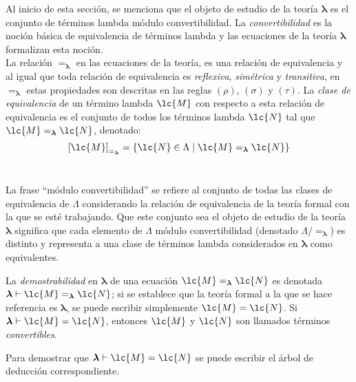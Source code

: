 Al inicio de esta sección, se menciona que el objeto de estudio de la teoría \(\boldsymbol{\lambda}\) es el conjunto de términos lambda módulo convertibilidad. La \emph{convertibilidad} es la noción básica de equivalencia de términos lambda y las ecuaciones de la teoría \(\boldsymbol{\lambda}\) formalizan esta noción. \\

La relación \(=_{\boldsymbol{\lambda}}\) en las ecuaciones de la teoría, es una relación de equivalencia y al igual que toda relación de equivalencia es \emph{reflexiva}, \emph{simétrica} y \emph{transitiva}, en \(=_{\boldsymbol{\lambda}}\) estas propiedades son descritas en las reglas \((\rho)\), \((\sigma)\) y \((\tau)\). La \emph{clase de equivalencia} de un término lambda \(\lc{M}\) con respecto a esta relación de equivalencia es el conjunto de todos los términos lambda \(\lc{N}\) tal que \(\lc{M}=_{\boldsymbol{\lambda}}\lc{N}\), denotado: \\

\[\left[ \lc{M} \right]_{=_{\boldsymbol{\lambda}}} = \left\{ \lc{N} \in \Lambda \mid \lc{M}=_{\boldsymbol{\lambda}}\lc{N} \right\}\] \

La frase ``módulo convertibilidad'' se refiere al conjunto de todas las clases de equivalencia de \(\Lambda\) considerando la relación de equivalencia de la teoría formal con la que se esté trabajando. Que este conjunto sea el objeto de estudio de la teoría \(\boldsymbol{\lambda}\) significa que cada elemento de \(\Lambda\) módulo convertibilidad (denotado \(\Lambda / =_{\boldsymbol{\lambda}}\)) es distinto y representa a una clase de términos lambda considerados en \(\boldsymbol{\lambda}\) como equivalentes. \\

\begin{defi}[Demostrabilidad] La \emph{demostrabilidad} en \(\boldsymbol{\lambda}\) de una ecuación \(\lc{M}=_{\boldsymbol{\lambda}}\lc{N}\) es denotada \(\boldsymbol{\lambda} \vdash \lc{M}=_{\boldsymbol{\lambda}}\lc{N}\); si se establece que la teoría formal a la que se hace referencia es \(\boldsymbol{\lambda}\), se puede escribir simplemente \(\lc{M}=\lc{N}\). Si \(\boldsymbol{\lambda} \vdash \lc{M}=\lc{N}\), entonces \(\lc{M}\) y \(\lc{N}\) son llamados términos \emph{convertibles}.
  \label{definicion:demostrabilidad}
\end{defi}

Para demostrar que \(\boldsymbol{\lambda} \vdash \lc{M}=\lc{N}\) se puede escribir el árbol de deducción correspondiente.

